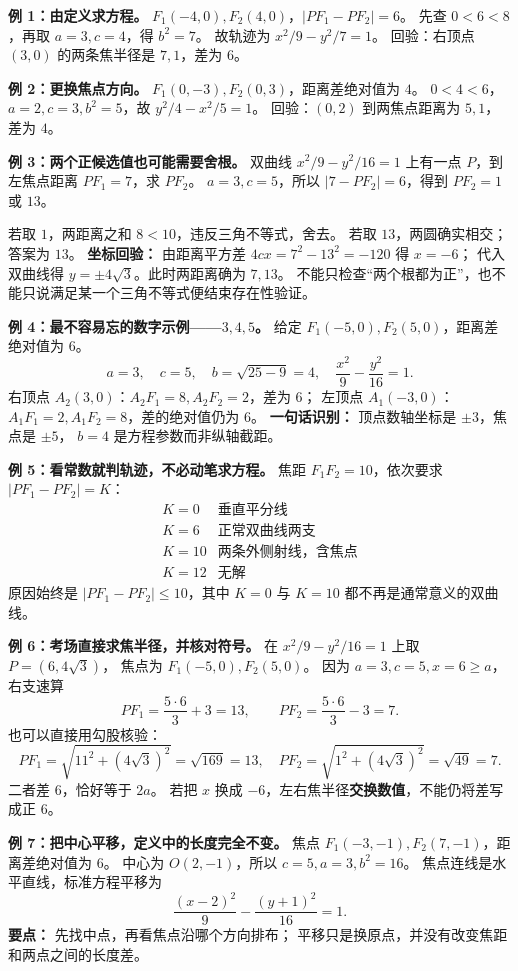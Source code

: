 \begin{examplebox}
\textbf{例 1：由定义求方程。}
$F_1(-4,0),F_2(4,0)$，$|PF_1-PF_2|=6$。
先查 $0<6<8$，再取 $a=3,c=4$，得 $b^2=7$。
故轨迹为 $\boxed{x^2/9-y^2/7=1}$。
回验：右顶点 $(3,0)$ 的两条焦半径是 $7,1$，差为 $6$。

\medskip
\textbf{例 2：更换焦点方向。}
$F_1(0,-3),F_2(0,3)$，距离差绝对值为 $4$。
$0<4<6$，$a=2,c=3,b^2=5$，故 $\boxed{y^2/4-x^2/5=1}$。
回验：$(0,2)$ 到两焦点距离为 $5,1$，差为 $4$。
\end{examplebox}
\begin{examplebox}
\textbf{例 3：两个正候选值也可能需要舍根。}
双曲线 $x^2/9-y^2/16=1$ 上有一点 $P$，到左焦点距离 $PF_1=7$，求 $PF_2$。
$a=3,c=5$，所以 $|7-PF_2|=6$，得到 $PF_2=1$ 或 $13$。

若取 $1$，两距离之和 $8<10$，违反三角不等式，舍去。
若取 $13$，两圆确实相交；答案为 $\boxed{13}$。
\textbf{坐标回验：} 由距离平方差 $4cx=7^2-13^2=-120$ 得 $x=-6$；
代入双曲线得 $y=\pm4\sqrt3$。此时两距离确为 $7,13$。
不能只检查“两个根都为正”，也不能只说满足某一个三角不等式便结束存在性验证。
\end{examplebox}
\clearpage

\begin{examplebox}
\textbf{例 4：最不容易忘的数字示例——$3,4,5$。}
给定 $F_1(-5,0),F_2(5,0)$，距离差绝对值为 $6$。
\[
a=3,\quad c=5,\quad b=\sqrt{25-9}=4,
\quad\boxed{\frac{x^2}{9}-\frac{y^2}{16}=1}.
\]
右顶点 $A_2(3,0)$：$A_2F_1=8,A_2F_2=2$，差为 $6$；
左顶点 $A_1(-3,0)$：$A_1F_1=2,A_1F_2=8$，差的绝对值仍为 $6$。
\textbf{一句话识别：} 顶点数轴坐标是 $\pm3$，焦点是 $\pm5$，
$b=4$ 是方程参数而非纵轴截距。

\medskip
\textbf{例 5：看常数就判轨迹，不必动笔求方程。}
焦距 $F_1F_2=10$，依次要求 $|PF_1-PF_2|=K$：
\[
\begin{array}{c|c}
K=0&\text{垂直平分线}\\
K=6&\text{正常双曲线两支}\\
K=10&\text{两条外侧射线，含焦点}\\
K=12&\text{无解}
\end{array}
\]
原因始终是 $|PF_1-PF_2|\le10$，其中 $K=0$ 与 $K=10$
都不再是通常意义的双曲线。
\end{examplebox}
\begin{examplebox}
\textbf{例 6：考场直接求焦半径，并核对符号。}
在 $x^2/9-y^2/16=1$ 上取 $P=(6,4\sqrt3)$，
焦点为 $F_1(-5,0),F_2(5,0)$。
因为 $a=3,c=5,x=6\ge a$，右支速算
\[
PF_1=\frac{5\cdot6}{3}+3=13,\qquad
PF_2=\frac{5\cdot6}{3}-3=7.
\]
也可以直接用勾股核验：
\[
PF_1=\sqrt{11^2+(4\sqrt3)^2}=\sqrt{169}=13,
\quad PF_2=\sqrt{1^2+(4\sqrt3)^2}=\sqrt{49}=7.
\]
二者差 $6$，恰好等于 $2a$。
若把 $x$ 换成 $-6$，左右焦半径\textbf{交换数值}，不能仍将差写成正 $6$。

\medskip
\textbf{例 7：把中心平移，定义中的长度完全不变。}
焦点 $F_1(-3,-1),F_2(7,-1)$，距离差绝对值为 $6$。
中心为 $O(2,-1)$，所以 $c=5,a=3,b^2=16$。
焦点连线是水平直线，标准方程平移为
\[
\boxed{\frac{(x-2)^2}{9}-\frac{(y+1)^2}{16}=1}.
\]
\textbf{要点：} 先找中点，再看焦点沿哪个方向排布；
平移只是换原点，并没有改变焦距和两点之间的长度差。
\end{examplebox}
\clearpage
